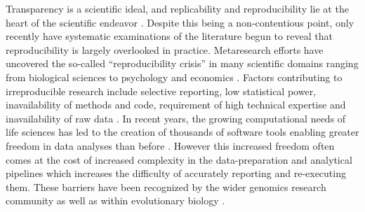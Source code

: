 \documentclass[10pt,letterpaper,table]{article}
\begin{document}
Transparency is a scientific ideal, and replicability and
reproducibility lie at the heart of the scientific endeavor
\cite{nas19,munafo17}. 
Despite this being a non-contentious point, only recently have
systematic examinations of the literature begun to reveal that
reproducibility is largely overlooked in practice.
%
Metaresearch efforts have uncovered the so-called ``reproducibility
crisis'' \cite{baker16} in many scientific domains ranging from biological sciences \cite{baker16} to psychology \cite{openscience15} and economics \cite{camerer16}. 
Factors contributing to irreproducible research include selective reporting, low statistical power, inavailability of methods and code, requirement of high technical expertise and inavailability of raw data \cite{baker16}. 
In recent years, the growing computational needs of life sciences has led to the creation of thousands of software tools \cite{callahan2018u} enabling greater freedom in data analyses than before \cite{eren2021community}. 
However this increased freedom often comes at the cost of increased complexity in the data-preparation and analytical pipelines \cite{eren2021community} which increases the difficulty of accurately reporting and re-executing them. 
These barriers have been recognized by the wider genomics research community \cite{eren2021community} as well as within evolutionary biology \cite{oakley2014osiris}. 
\end{document}

